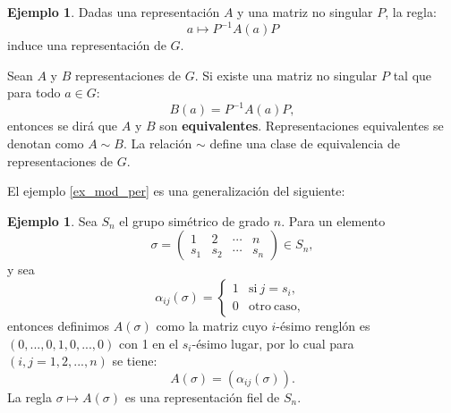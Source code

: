 \documentclass[12pt]{book}
\theoremstyle{definition}
\newtheorem{example}[theorem]{Ejemplo}
\newcounter{in}
\newcounter{ini}
\begin{document}
\begin{example}
  \label{Ej5}
  Dadas una representación $A$ y una matriz no singular $P$, la regla:
  \begin{equation*}
    a \mapsto P^{-1}A\left(a\right)P
  \end{equation*}  
  induce una representación de $G$.

  Sean $A$ y $B$ representaciones de $G$. Si existe una
  matriz no singular $P$ tal que para todo $a \in G$:
  \begin{equation*}
    B\left(a\right)= P^{-1}A\left(a\right)P,
  \end{equation*}
  entonces se dirá que $A$ y $B$ son
  \textbf{equivalentes}. Representaciones equivalentes se denotan como
  $A \sim B$. La relación $\sim$ define una clase de equivalencia de
  representaciones de $G$.
\end{example}
El ejemplo \ref{ex_mod_per} es una generalización del siguiente:
\begin{example}
  \label{Ej3}
  Sea $S_{n}$ el grupo simétrico de grado $n$. Para un elemento
  \begin{equation}
    \label{eq:1}
    \sigma =
    \begin{pmatrix}
      1 & 2 & \cdots  & n\\
      s_{1} & s_{2} & \cdots & s_{n}
    \end{pmatrix} 
    \in S_{n},
  \end{equation}
  y sea
  \begin{equation*}
    \alpha_{ij}\left(\sigma\right) = \left\{
      \begin{array}{ll}
        1      & \mathrm{si\ } j = s_{i}, \\
        0      & \mathrm{otro\ caso,\ } 
      \end{array}
    \right.
  \end{equation*}
  entonces definimos $A\left(\sigma\right)$ como la matriz cuyo
  $i$-ésimo renglón es $\left(0,...,0,1,0,...,0\right)$ con 1 en el
  $s_{i}$-ésimo lugar, por lo cual para $\left(i,j=1,2,...,n\right)$
  se tiene:
  \begin{equation*}
    A\left(\sigma\right) = \left(\alpha_{ij}\left(\sigma\right)\right).
  \end{equation*}
  La regla $\sigma \mapsto A\left(\sigma\right)$ es una representación
  fiel de $S_{n}$.
\end{example}
\end{document}
